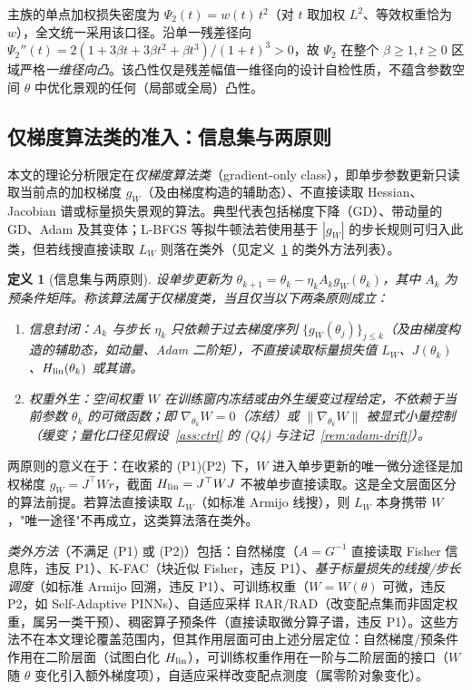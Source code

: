 \documentclass[fontset=windows,11pt]{ctexart}
\newcommand{\W}{W}
\newtheorem{definition}{定义}[section]
\numberwithin{equation}{section}
\begin{document}
主族的单点加权损失密度为 $\Psi_2(t)=w(t)\,t^2$（对 $t$ 取加权 $L^2$、等效权重恰为 $w$），全文统一采用该口径。沿单一残差径向 $\Psi_2''(t)=2(1+3\beta t+3\beta t^2+\beta t^3)/(1+t)^3>0$，故 $\Psi_2$ 在整个 $\beta\ge1,t\ge0$ 区域严格\emph{一维径向凸}。该凸性仅是残差幅值一维径向的设计自检性质，不蕴含参数空间 $\theta$ 中优化景观的任何（局部或全局）凸性。

\subsection{仅梯度算法类的准入：信息集与两原则}\label{sec:admit}
本文的理论分析限定在\emph{仅梯度算法类}（gradient-only class），即单步参数更新只读取当前点的加权梯度 $g_\W$（及由梯度构造的辅助态）、不直接读取 Hessian、Jacobian 谱或标量损失景观的算法。典型代表包括梯度下降（GD）、带动量的 GD、Adam 及其变体；L-BFGS 等拟牛顿法若使用基于 $|g_\W|$ 的步长规则可归入此类，但若线搜直接读取 $L_\W$ 则落在类外（见定义~\ref{def:admit} 的类外方法列表）。

\begin{definition}[信息集与两原则]\label{def:admit}
设单步更新为 $\theta_{k+1}=\theta_k-\eta_k A_k g_\W(\theta_k)$，其中 $A_k$ 为预条件矩阵。称该算法属于仅梯度类，当且仅当以下两条原则成立：
\begin{enumerate}[label=\textup{(P\arabic*)},leftmargin=2em]
\item \emph{信息封闭}：$A_k$ 与步长 $\eta_k$ 只依赖于过去梯度序列 $\{g_\W(\theta_j)\}_{j\le k}$（及由梯度构造的辅助态，如动量、Adam 二阶矩），不直接读取标量损失值 $L_\W$、$J(\theta_k)$、$H_{\rm lin}(\theta_k)$ 或其谱。
\item \emph{权重外生}：空间权重 $\W$ 在训练窗内冻结或由外生缓变过程给定，不依赖于当前参数 $\theta_k$ 的可微函数；即 $\nabla_{\theta_k}\W=0$（冻结）或 $\|\nabla_{\theta_k}\W\|$ 被显式小量控制（缓变；量化口径见假设~\ref{ass:ctrl} 的 (Q4) 与注记~\ref{rem:adam-drift}）。
\end{enumerate}
\end{definition}

两原则的意义在于：在收紧的 (P1)(P2) 下，$\W$ 进入单步更新的唯一微分途径是加权梯度 $g_\W=J^\top\W r$，截面 $H_{\rm lin}=J^\top\W J$ 不被单步直接读取。这是全文层面区分的算法前提。若算法直接读取 $L_\W$（如标准 Armijo 线搜），则 $L_\W$ 本身携带 $\W$，"唯一途径"不再成立，这类算法落在类外。

\emph{类外方法}（不满足 (P1) 或 (P2)）包括：自然梯度（$A=G^{-1}$ 直接读取 Fisher 信息阵，违反 P1）、K-FAC（块近似 Fisher，违反 P1）、\emph{基于标量损失的线搜/步长调度}（如标准 Armijo 回溯，违反 P1）、可训练权重（$\W=\W(\theta)$ 可微，违反 P2，如 Self-Adaptive PINNs\cite{McClenny2020}）、自适应采样 RAR/RAD（改变配点集而非固定权重，属另一类干预）、稠密算子预条件（直接读取微分算子谱，违反 P1）。这些方法不在本文理论覆盖范围内，但其作用层面可由上述分层定位：自然梯度/预条件作用在二阶层面（试图白化 $H_{\rm lin}$），可训练权重作用在一阶与二阶层面的接口（$\W$ 随 $\theta$ 变化引入额外梯度项），自适应采样改变配点测度（属零阶对象变化）。
\end{document}

